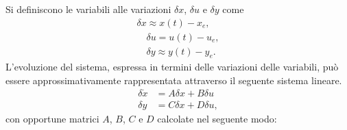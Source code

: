 \documentclass[a4paper, 11pt]{article}
\begin{document}
%
Si definiscono le variabili alle variazioni $\delta x$, $\delta u$ e $\delta y$ come 
%
\begin{align*}
	\delta x \approx x(t)-x_e, \\
	\quad 
	\delta u = u(t)-u_e, \\
	\quad
	\delta y \approx y(t)-y_e. 
\end{align*}
%
L’evoluzione del sistema, espressa in termini delle variazioni delle variabili, può essere approssimativamente rappresentata attraverso il seguente sistema lineare.
%
\begin{subequations}\label{eq:linearized_system}
\begin{align}
	\delta \dot{x} &= A\delta x + B\delta u
	\\
	\delta y &= C\delta x + D\delta u,
\end{align}
\end{subequations}
%
con opportune matrici $A$, $B$, $C$ e $D$  calcolate nel seguente modo:
%
\end{document}
